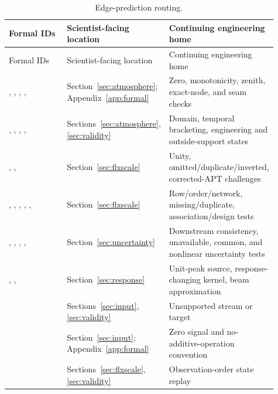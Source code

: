 \begin{longtable}{L{0.30\linewidth}L{0.26\linewidth}L{0.35\linewidth}}
\caption{Edge-prediction routing.}\\
\toprule Formal IDs & Scientist-facing location & Continuing engineering home \\
\midrule\endfirsthead\toprule Formal IDs & Scientist-facing location & Continuing engineering home \\
\midrule\endhead
{}, , , ,  & Section~\ref{sec:atmosphere}; Appendix~\ref{app:formal} & Zero, monotonicity, zenith, exact-node, and seam checks \\
, , , ,  & Sections~\ref{sec:atmosphere}, \ref{sec:validity} & Domain, temporal bracketing, engineering and outside-support states \\
, ,  & Section~\ref{sec:flxscale} & Unity, omitted/duplicate/inverted, corrected-APT challenges \\
, , , , ,  & Section~\ref{sec:flxscale} & Row/order/network, missing/duplicate, association/design tests \\
, , , ,  & Section~\ref{sec:uncertainty} & Downstream consistency, unavailable, common, and nonlinear uncertainty tests \\
, ,  & Section~\ref{sec:response} & Unit-peak source, response-changing kernel, beam approximation \\
 & Sections~\ref{sec:input}, \ref{sec:validity} & Unsupported stream or target \\
 & Section~\ref{sec:input}; Appendix~\ref{app:formal} & Zero signal and no-additive-operation convention \\
 & Sections~\ref{sec:flxscale}, \ref{sec:validity} & Observation-order state replay \\
\bottomrule
\end{longtable}
